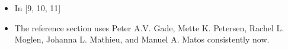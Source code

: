 \documentclass[10pt]{article}
\newcommand{\nt}[1]{\textcolor{newtextcolor}{#1}}
\begin{document}
\begin{itemize}
  \item \nt{In [9, 10, 11]}
  \item The reference section uses \nt{Peter A.V. Gade}, \nt{Mette K. Petersen}, \nt{Rachel L. Moglen}, \nt{Johanna L. Mathieu}, and \nt{ Manuel A. Matos}  consistently now.
\end{itemize}


\newpage
\begin{thebibliography}{1}
  \providecommand{\natexlab}[1]{#1}
  \providecommand{\url}[1]{\texttt{#1}}
  \providecommand{\urlprefix}{URL}









\end{thebibliography}
\end{document}
